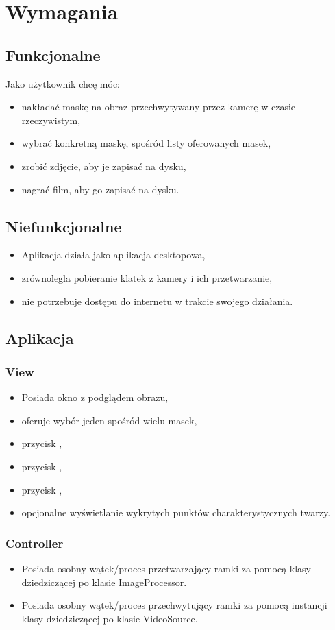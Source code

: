 \section{Wymagania}
\subsection{Funkcjonalne}
Jako użytkownik chcę móc:
\begin{itemize}
    \item nakładać maskę na obraz przechwytywany przez kamerę w czasie rzeczywistym,
    \item wybrać konkretną maskę, spośród listy oferowanych masek,
    \item zrobić zdjęcie, aby je zapisać na dysku,
    \item nagrać film, aby go zapisać na dysku.
\end{itemize}
\subsection{Niefunkcjonalne}
\begin{itemize}
    \item Aplikacja działa jako aplikacja desktopowa,
    \item zrównolegla pobieranie klatek z kamery i ich przetwarzanie,
    \item nie potrzebuje dostępu do internetu w trakcie swojego działania.
\end{itemize}

\subsection{Aplikacja}
\subsubsection{View}
\begin{itemize}
    \item Posiada okno z podglądem obrazu,
    \item oferuje wybór jeden spośród wielu masek,
    \item przycisk ,
    \item przycisk ,
    \item przycisk ,
    \item opcjonalne wyświetlanie wykrytych punktów charakterystycznych twarzy.
\end{itemize}
\subsubsection{Controller}
\begin{itemize}
    \item Posiada osobny wątek/proces przetwarzający ramki za pomocą klasy dziedziczącej po klasie ImageProcessor.
    \item Posiada osobny wątek/proces przechwytujący ramki za pomocą instancji klasy dziedziczącej po klasie VideoSource.
\end{itemize}

